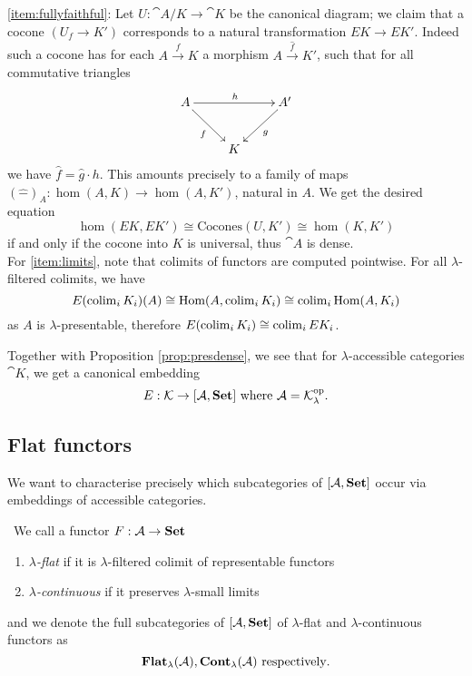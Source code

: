\begin{Proof}
\ref{item:fullyfaithful}: Let $U : \cat A/K \to \cat K$ be the canonical diagram; we claim that a cocone $(U_f \to K')$ corresponds to a natural transformation $EK \to EK'$. Indeed such a cocone has for each $A \xrightarrow{f} K$ a morphism $A \xrightarrow{\hat f} K'$, such that for all commutative triangles
\[
\xymatrix{
A \ar[rr]^{h} \ar[rd]_{f} & & A' \ar[ld]^{g} \\
& K
}\]
we have $\hat f = \hat g \cdot h$. This amounts precisely to a family of maps $(\widehat{-})_A: \hom(A,K) \to \hom(A,K')$, natural in $A$. We get the desired equation
\[ \hom(EK,EK') \cong \textrm{Cocones}(U, K') \cong \hom(K,K') \] 
if and only if the cocone into $K$ is universal, thus $\cat A$ is dense. \\

For \ref{item:limits}, note that colimits of functors are computed pointwise. For all $\lambda$-filtered colimits, we have
\[ E(\operatorname{colim}_i K_i)(A) \cong \textrm{Hom}(A,\operatorname{colim}_i K_i) \cong \operatorname{colim}_i \textrm{Hom}(A,K_i) \]
as $A$ is $\lambda$-presentable, therefore $E(\operatorname{colim}_i K_i) \cong \operatorname{colim}_i EK_i$.
\end{Proof}

Together with Proposition \ref{prop:presdense}, we see that for $\lambda$-accessible categories $\cat K$, we get a canonical embedding
\[ E : \mathcal{K} \to [\mathcal{A},\mathbf{Set}] \text{ where } \mathcal{A} = \mathcal{K}^{\textrm{op}}_\lambda. \]

\subsection{Flat functors}
We want to characterise precisely which subcategories of $[\mathcal{A},\mathbf{Set}]$ occur via embeddings of accessible categories.

\begin{Definition}\
We call a functor $F : \mathcal{A} \to \mathbf{Set}$
\begin{enumerate}
\item \emph{$\lambda$-flat} if it is $\lambda$-filtered colimit of representable functors
\item \emph{$\lambda$-continuous} if it preserves $\lambda$-small limits
\end{enumerate}
and we denote the full subcategories of $[\mathcal{A},\mathbf{Set}]$ of $\lambda$-flat and $\lambda$-continuous functors as 
\[ \mathbf{Flat}_\lambda(\mathcal{A}), \mathbf{Cont}_\lambda(\mathcal{A}) \text{ respectively}. \]
\end{Definition}

